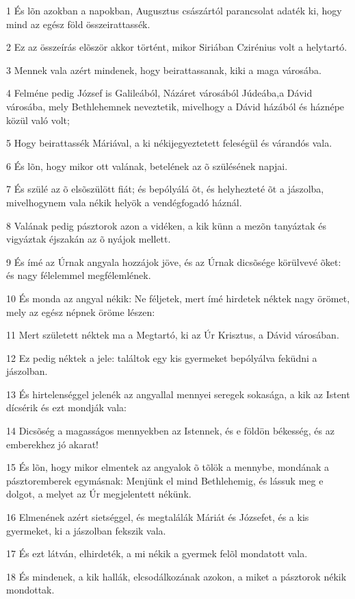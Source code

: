 \par 1 És lõn azokban a napokban, Augusztus császártól parancsolat adaték ki, hogy mind az egész föld összeirattassék.
\par 2 Ez az összeírás elõször akkor történt, mikor Siriában Czirénius volt a helytartó.
\par 3 Mennek vala azért mindenek, hogy beirattassanak, kiki a maga városába.
\par 4 Felméne pedig József is Galileából, Názáret városából Júdeába,a Dávid városába, mely Bethlehemnek neveztetik, mivelhogy a Dávid házából és háznépe közül való volt;
\par 5 Hogy beirattassék Máriával, a ki nékijegyeztetett feleségül és várandós vala.
\par 6 És lõn, hogy mikor ott valának, betelének az õ szülésének napjai.
\par 7 És szülé az õ elsõszülött fiát; és bepólyálá õt, és helyhezteté õt a jászolba, mivelhogynem vala nékik helyök a vendégfogadó háznál.
\par 8 Valának pedig pásztorok azon a vidéken, a kik künn a mezõn tanyáztak és vigyáztak éjszakán az õ nyájok mellett.
\par 9 És ímé az Úrnak angyala hozzájok jöve, és az Úrnak dicsõsége körülvevé õket: és nagy félelemmel megfélemlének.
\par 10 És monda az angyal nékik: Ne féljetek, mert ímé hirdetek néktek nagy örömet, mely az egész népnek öröme lészen:
\par 11 Mert született néktek ma a Megtartó, ki az Úr Krisztus, a Dávid városában.
\par 12 Ez pedig néktek a jele: találtok egy kis gyermeket bepólyálva feküdni a jászolban.
\par 13 És hirtelenséggel jelenék az angyallal mennyei seregek sokasága, a kik az Istent dícsérik és ezt mondják vala:
\par 14 Dicsõség a magasságos mennyekben az Istennek, és e földön békesség, és az emberekhez jó akarat!
\par 15 És lõn, hogy mikor elmentek az angyalok õ tõlök a mennybe, mondának a pásztoremberek egymásnak: Menjünk el mind Bethlehemig, és lássuk meg e dolgot, a melyet az Úr megjelentett nékünk.
\par 16 Elmenének azért sietséggel, és megtalálák Máriát és Józsefet, és a kis gyermeket, ki a jászolban fekszik vala.
\par 17 És ezt látván, elhirdeték, a mi nékik a gyermek felõl mondatott vala.
\par 18 És mindenek, a kik hallák, elcsodálkozának azokon, a miket a pásztorok nékik mondottak.
